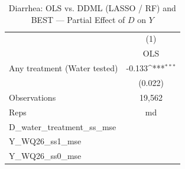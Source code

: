 \begin{table}[htbp]\centering
\def\sym#1{\ifmmode^{#1}\else\(^{#1}\)\fi}
\caption{Diarrhea: OLS vs. DDML (LASSO / RF) and BEST — Partial Effect of $D$ on $Y$}
\begin{tabular}{l*{1}{c}}
\toprule
                &\multicolumn{1}{c}{(1)}\\
                &\multicolumn{1}{c}{OLS}\\
\midrule
Any treatment (Water tested)&   -0.133\sym{***}\\
                &  (0.022)         \\
\midrule
Observations    &   19,562         \\
Reps            &       md         \\
D\_water\_treatment\_ss\_mse&                  \\
Y\_WQ26\_ss1\_mse  &                  \\
Y\_WQ26\_ss0\_mse  &                  \\
\bottomrule
\end{tabular}
\end{table}
